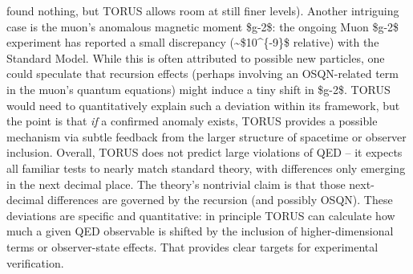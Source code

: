 \documentclass[]{article}
\begin{document}
{found nothing, but TORUS allows room at still finer levels). Another
intriguing case is the muon's anomalous magnetic moment \$g-2\$: the
ongoing Muon \$g-2\$ experiment has reported a small discrepancy
(\textasciitilde{}\$10\^{}\{-9\}\$ relative) with the Standard Model.
While this is often attributed to possible new particles, one could
speculate that recursion effects (perhaps involving an OSQN-related term
in the muon's quantum equations) might induce a tiny shift in \$g-2\$.
TORUS would need to quantitatively explain such a deviation within its
framework, but the point is that \emph{if} a confirmed anomaly exists,
TORUS provides a possible mechanism via subtle feedback from the larger
structure of spacetime or observer inclusion. Overall, TORUS does not
predict large violations of QED -- it expects all familiar tests to
nearly match standard theory, with differences only emerging in the next
decimal place. The theory's nontrivial claim is that those next-decimal
differences are governed by the recursion (and possibly OSQN). These
deviations are specific and quantitative: in principle TORUS can
calculate how much a given QED observable is shifted by the inclusion of
higher-dimensional terms or observer-state effects. That provides clear
targets for experimental verification.}
\end{document}

